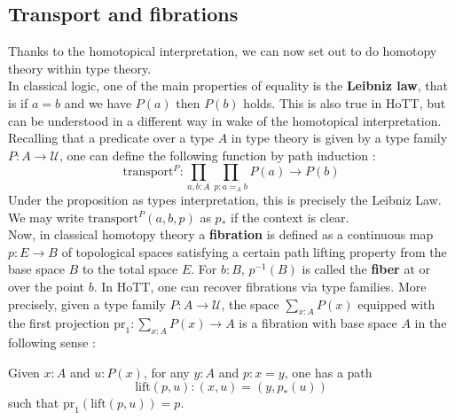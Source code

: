\documentclass{report}
\begin{document}
\subsection{Transport and fibrations}
Thanks to the homotopical interpretation, we can now set out to do homotopy theory within type theory.\\
In classical logic, one of the main properties of equality is the \textbf{Leibniz law}, that is if $a=b$ and we have $P(a)$ then $P(b)$ holds. This is also true in HoTT, but can be understood in a different way in wake of the homotopical interpretation. Recalling that a predicate over a type $A$ in type theory is given by a type family $P : A \rightarrow \mathcal{U}$, one can define the following function by path induction :
$$\mathrm{transport}^P : \prod_{a,b : A} \prod_{p : a=_A b} P(a) \rightarrow P(b)$$
Under the proposition as types interpretation, this is precisely the Leibniz Law. We may write $\mathrm{transport}^P(a,b,p)$ as $p_*$ if the context is clear.\\
Now, in classical homotopy theory a \textbf{fibration} is defined as a continuous map $p : E \rightarrow B$ of topological spaces satisfying a certain path lifting property from the base space $B$ to the total space $E$. For $b : B$, $p^{-1}(B)$ is called the \textbf{fiber} at or over the point $b$. In HoTT, one can recover fibrations via type families. More precisely, given a type family $P : A \rightarrow \mathcal{U}$, the space $ \sum_{x : A} P(x)$ equipped with the first projection $\mathrm{pr}_1 : \sum_{x : A} P(x) \rightarrow A$ is a fibration with base space $A$ in the following sense : 
\begin{prop}
  Given $x : A$ and $u : P(x)$, for any $y : A$ and $p : x=y$, one has a path 
  $$\mathrm{lift}(p,u) : (x,u) = (y,p_*(u))$$
  such that $\mathrm{pr}_1(\mathrm{lift}(p,u)) = p$.
\end{prop}
\begin{center}
\end{center}
\end{document}
